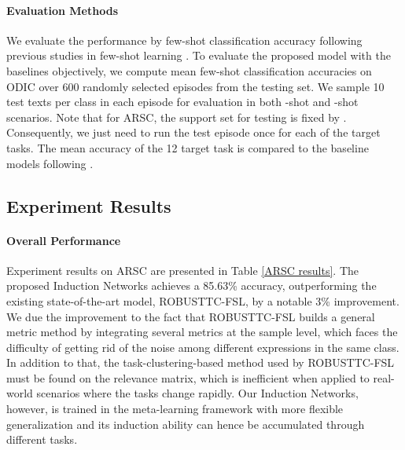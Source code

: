 \documentclass[11pt,a4paper]{article}
\begin{document}
\paragraph{Evaluation Methods} We evaluate the performance by few-shot classification accuracy following previous studies in few-shot learning \citep{snell2017prototypical,sung2018learning}. To evaluate the proposed model with the baselines objectively, we compute mean few-shot classification accuracies on ODIC over 600 randomly selected episodes from the testing set. We sample 10 test texts per class in each episode for evaluation in both -shot and -shot scenarios. Note that for ARSC, the support set for testing is fixed by \citet{yu2018diverse}. Consequently, we just need to run the test episode once for each of the target tasks. The mean accuracy of the 12 target task is compared to the baseline models following \citet{yu2018diverse}.

\subsection{Experiment Results}

\paragraph{Overall Performance} Experiment results on ARSC are presented in Table \ref{ARSC results}. The proposed Induction Networks achieves a 85.63\% accuracy, outperforming the existing state-of-the-art model, ROBUSTTC-FSL, by a notable 3\% improvement. We due the improvement to the fact that ROBUSTTC-FSL builds a general metric method by integrating several metrics at the sample level, which faces the difficulty of getting rid of the noise among different expressions in the same class. In addition to that, the task-clustering-based method used by ROBUSTTC-FSL must be found on the relevance matrix, which is inefficient when applied to real-world scenarios where the tasks change rapidly. Our Induction Networks, however, is trained in the meta-learning framework with more flexible generalization and its induction ability can hence be accumulated through different tasks.
\end{document}
